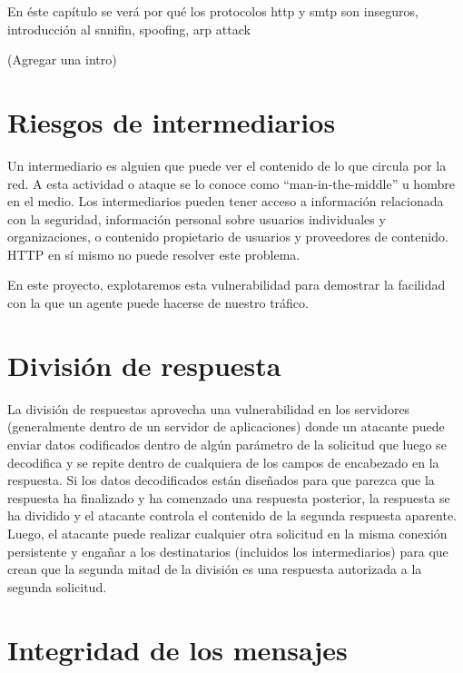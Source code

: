 
En éste capítulo se verá por qué los protocolos http y smtp son inseguros, introducción al snnifin, spoofing, arp attack

(Agregar una intro)


\section{Riesgos de intermediarios}

Un intermediario es alguien que puede ver el contenido de lo que circula por 
la red. A esta actividad o ataque se lo conoce como “man-in-the-middle” u 
hombre en el medio. Los intermediarios pueden tener acceso a información 
relacionada con la seguridad, información personal sobre usuarios individuales 
y organizaciones, o contenido propietario de usuarios y proveedores de 
contenido. HTTP en sí mismo no puede resolver este problema.

En este proyecto, explotaremos esta vulnerabilidad para demostrar la facilidad
 con la que un agente puede hacerse de nuestro tráfico.


\section{División de respuesta}


La división de respuestas aprovecha una vulnerabilidad en los servidores 
(generalmente dentro de un servidor de aplicaciones) donde un atacante 
puede enviar datos codificados dentro de algún parámetro de la solicitud 
que luego se decodifica y se repite dentro de cualquiera de los campos de 
encabezado en la respuesta. Si los datos decodificados están diseñados para 
que parezca que la respuesta ha finalizado y ha comenzado una respuesta 
posterior, la respuesta se ha dividido y el atacante controla el contenido 
de la segunda respuesta aparente. Luego, el atacante puede realizar 
cualquier otra solicitud en la misma conexión persistente y engañar a los 
destinatarios (incluidos los intermediarios) para que crean que la segunda 
mitad de la división es una respuesta autorizada a la segunda solicitud.



\section{Integridad de los mensajes}

